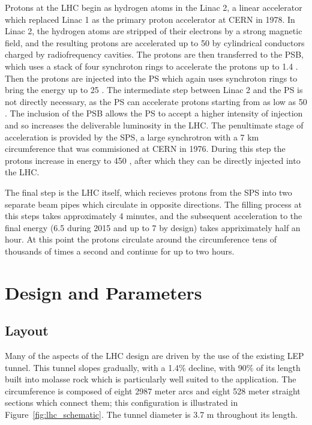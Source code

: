 Protons at the \ac{LHC} begin as hydrogen atoms in the Linac 2, a linear accelerator which replaced Linac 1 as the primary proton accelerator at CERN in 1978.
In Linac 2, the hydrogen atoms are stripped of their electrons by a strong magnetic field, and the resulting protons are accelerated up to 50 \MeV by cylindrical conductors charged by radiofrequency cavities.
The protons are then transferred to the \ac{PSB}, which uses a stack of four synchroton rings to accelerate the protons up to 1.4 \GeV.
Then the protons are injected into the \ac{PS} which again uses synchroton rings to bring the energy up to 25 \GeV.
The intermediate step between Linac 2 and the \ac{PS} is not directly necessary, as the \ac{PS} can accelerate protons starting from as low as 50 \MeV.
The inclusion of the \ac{PSB} allows the \ac{PS} to accept a higher intensity of injection and so increases the deliverable luminosity in the \ac{LHC}.
The penultimate stage of acceleration is provided by the \ac{SPS}, a large synchrotron with a 7 km circumference that was commisioned at CERN in 1976.
During this step the protons increase in energy to 450 \GeV, after which they can be directly injected into the \ac{LHC}. 


The final step is the \ac{LHC} itself, which recieves protons from the \ac{SPS} into two separate beam pipes which circulate in opposite directions.
The filling process at this steps takes approximately 4 minutes, and the subsequent acceleration to the final energy (6.5 \TeV during 2015 and up to 7 \TeV by design) takes appriximately half an hour.
At this point the protons circulate around the circumference tens of thousands of times a second and continue for up to two hours.


\section{Design and Parameters}

\subsection{Layout}

Many of the aspects of the \ac{LHC} design are driven by the use of the existing \ac{LEP} tunnel. 
This tunnel slopes gradually, with a 1.4\% decline, with 90\% of its length built into molasse rock which is particularly well suited to the application.
The circumference is composed of eight 2987 meter arcs and eight 528 meter straight sections which connect them; this configuration is illustrated in Figure~\ref{fig:lhc_schematic}.
The tunnel diameter is 3.7 m throughout its length. 

